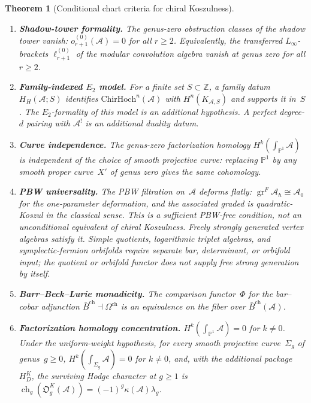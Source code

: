 \documentclass[11pt,reqno]{amsart}
\newtheorem{theorem}{Theorem}[section]
\theoremstyle{definition}
\theoremstyle{remark}
\newcommand{\cA}{\mathcal{A}}
\newcommand{\barBch}{\bar{B}^{\mathrm{ch}}}
\newcommand{\ChirHoch}{\mathrm{ChirHoch}}
\newcommand{\bP}{\mathbb{P}}
\newcommand{\Etwo}{E_2}
\newcommand{\Linfty}{L_\infty}
\DeclareMathOperator{\gr}{gr}
\numberwithin{equation}{section}
\begin{document}
\begin{theorem}[Conditional chart criteria for chiral Koszulness]
\begin{enumerate}[label=\textup{(\roman*)},leftmargin=2.4em]
\item\label{item:kfc-shadow}
\textbf{Shadow-tower formality.}
The genus-zero obstruction classes of the shadow tower vanish:
$o_{r+1}^{(0)}(\cA) = 0$ for all $r \geq 2$.
Equivalently, the transferred $\Linfty$-brackets
$\ell_{r+1}^{(0)}$ of the modular convolution algebra vanish at
genus zero for all $r \geq 2$.

\item\label{item:kfc-e2formality}
\textbf{Family-indexed $\Etwo$ model.}
For a finite set $S\subset\mathbb Z$, a family datum
$H_H(\cA;S)$ identifies $\ChirHoch^n(\cA)$ with
$H^n(K_{\cA,S})$ and supports it in~$S$.  The $\Etwo$-formality
of this model is an additional hypothesis.  A perfect degree-$d$
pairing with $\cA^!$ is an additional duality datum.

\item\label{item:kfc-curve-indep}
\textbf{Curve independence.}
The genus-zero factorization homology
$H^k(\int_{\bP^1}\cA)$ is independent of the choice of smooth
projective curve: replacing $\bP^1$ by any smooth proper
curve~$X'$ of genus zero gives the same cohomology.

\item\label{item:kfc-pbw-univ}
\textbf{PBW universality.}
The PBW filtration on~$\cA$ deforms flatly:
$\gr^F \cA_\hbar \cong \cA_0$ for the one-parameter deformation,
and the associated graded is quadratic-Koszul in the classical
sense.
This is a sufficient PBW-free condition, not an unconditional
equivalent of chiral Koszulness. Freely strongly generated vertex
algebras satisfy it. Simple quotients, logarithmic triplet
algebras, and symplectic-fermion orbifolds require separate
bar, determinant, or orbifold input; the quotient or orbifold
functor does not supply free strong generation by itself.

\item\label{item:kfc-bbl}
\textbf{Barr--Beck--Lurie monadicity.}
The comparison functor~$\Phi$ for the bar--cobar adjunction
$\barBch \dashv \Omega^{\mathrm{ch}}$ is an equivalence on the
fiber over $\barBch(\cA)$.

\item\label{item:kfc-fh}
\textbf{Factorization homology concentration.}
$H^k(\int_{\bP^1}\cA) = 0$ for $k \neq 0$.
Under the uniform-weight hypothesis, for every smooth projective
curve~$\Sigma_g$ of genus~$g \geq 0$,
$H^k(\int_{\Sigma_g}\cA) = 0$ for $k \neq 0$,
and, with the additional package~$H_D^K$, the surviving Hodge
character at $g\ge1$ is
$\operatorname{ch}_g(\mathfrak O_g^K(\cA))
=(-1)^g\kappa(\cA)\lambda_g$.


\end{enumerate}
\end{theorem}
\end{document}
